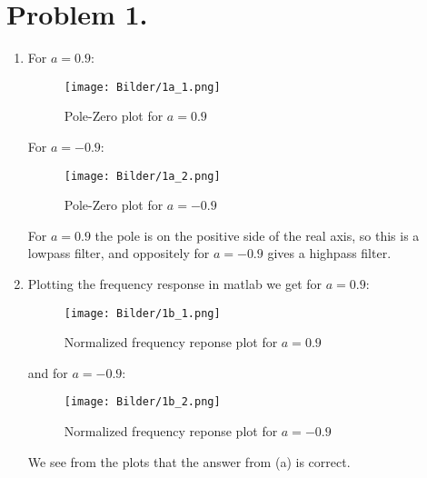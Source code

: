 \documentclass[a4paper,11pt,norsk]{article}
\begin{document}


\section*{Problem 1.}
\begin{enumerate}
    \item 
        For $a = 0.9$:
        \begin{figure}[H]
            \centering
            \texttt{[image: Bilder/1a\_1.png]}
            \caption{Pole-Zero plot for $a = 0.9$}
        \end{figure}
        For $a = -0.9$:
        \begin{figure}[H]
            \centering
            \texttt{[image: Bilder/1a\_2.png]}
            \caption{Pole-Zero plot for $a = -0.9$}
        \end{figure}
        For $a = 0.9$ the pole is on the positive side of the real axis, so this is a lowpass filter, and 
        oppositely for $a = -0.9$ gives a highpass filter.

    \item Plotting the frequency response in matlab we get for $a = 0.9$:
        \begin{figure}[H]
            \centering
            \texttt{[image: Bilder/1b\_1.png]}
            \caption{Normalized frequency reponse plot for $a = 0.9$}
        \end{figure}
        and for $a = -0.9$:
        \begin{figure}[H]
            \centering
            \texttt{[image: Bilder/1b\_2.png]}
            \caption{Normalized frequency reponse plot for $a = -0.9$}
        \end{figure}
        We see from the plots that the answer from (a) is correct.
\end{enumerate}
\end{document}
